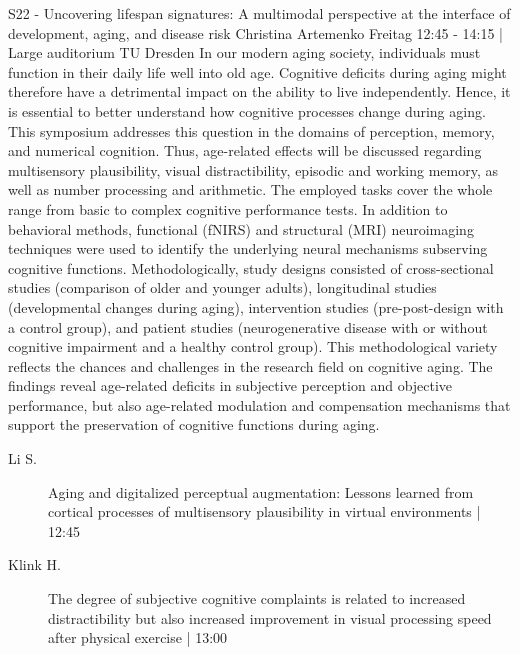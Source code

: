 
            \begin{symposium}
            {S22 - Uncovering lifespan signatures: A multimodal perspective at the interface of development, aging, and disease risk }
            {Christina Artemenko}
            {Freitag 12:45 - 14:15 | Large auditorium}
            {TU Dresden}
            In our modern aging society, individuals must function in their daily life well into old age. Cognitive deficits during aging might therefore have a detrimental impact on the ability to live independently. Hence, it is essential to better understand how cognitive processes change during aging.
This symposium addresses this question in the domains of perception, memory, and numerical cognition. Thus, age-related effects will be discussed regarding multisensory plausibility, visual distractibility, episodic and working memory, as well as number processing and arithmetic. The employed tasks cover the whole range from basic to complex cognitive performance tests.
In addition to behavioral methods, functional (fNIRS) and structural (MRI) neuroimaging techniques were used to identify the underlying neural mechanisms subserving cognitive functions. Methodologically, study designs consisted of cross-sectional studies (comparison of older and younger adults), longitudinal studies (developmental changes during aging), intervention studies (pre-post-design with a control group), and patient studies (neurogenerative disease with or without cognitive impairment and a healthy control group). This methodological variety reflects the chances and challenges in the research field on cognitive aging.
The findings reveal age-related deficits in subjective perception and objective performance, but also age-related modulation and compensation mechanisms that support the preservation of cognitive functions during aging.
            \begin{description}    
            
                \item [ Li S.] Aging and digitalized perceptual augmentation: Lessons learned from cortical processes of multisensory plausibility in virtual environments \textcolor{mygray}{ | 12:45}    
                
                \item [ Klink H.] The degree of subjective cognitive complaints is related to increased distractibility but also increased improvement in visual processing speed after physical exercise \textcolor{mygray}{ | 13:00}    
                

\end{description}
\end{symposium}

